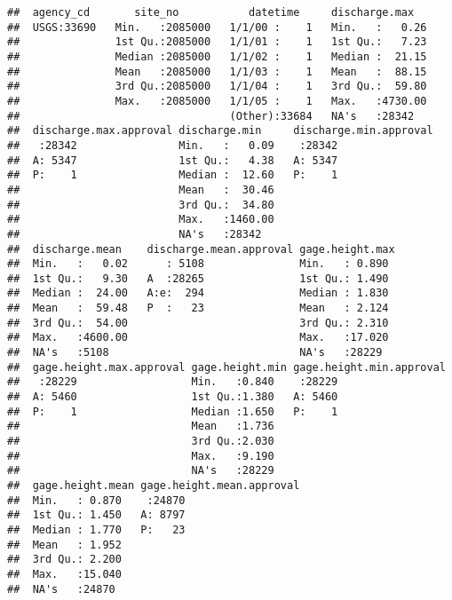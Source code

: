 \documentclass[]{article}
\begin{document}
\begin{verbatim}
##  agency_cd       site_no           datetime     discharge.max    
##  USGS:33690   Min.   :2085000   1/1/00 :    1   Min.   :   0.26  
##               1st Qu.:2085000   1/1/01 :    1   1st Qu.:   7.23  
##               Median :2085000   1/1/02 :    1   Median :  21.15  
##               Mean   :2085000   1/1/03 :    1   Mean   :  88.15  
##               3rd Qu.:2085000   1/1/04 :    1   3rd Qu.:  59.80  
##               Max.   :2085000   1/1/05 :    1   Max.   :4730.00  
##                                 (Other):33684   NA's   :28342    
##  discharge.max.approval discharge.min     discharge.min.approval
##   :28342                Min.   :   0.09    :28342               
##  A: 5347                1st Qu.:   4.38   A: 5347               
##  P:    1                Median :  12.60   P:    1               
##                         Mean   :  30.46                         
##                         3rd Qu.:  34.80                         
##                         Max.   :1460.00                         
##                         NA's   :28342                           
##  discharge.mean    discharge.mean.approval gage.height.max 
##  Min.   :   0.02      : 5108               Min.   : 0.890  
##  1st Qu.:   9.30   A  :28265               1st Qu.: 1.490  
##  Median :  24.00   A:e:  294               Median : 1.830  
##  Mean   :  59.48   P  :   23               Mean   : 2.124  
##  3rd Qu.:  54.00                           3rd Qu.: 2.310  
##  Max.   :4600.00                           Max.   :17.020  
##  NA's   :5108                              NA's   :28229   
##  gage.height.max.approval gage.height.min gage.height.min.approval
##   :28229                  Min.   :0.840    :28229                 
##  A: 5460                  1st Qu.:1.380   A: 5460                 
##  P:    1                  Median :1.650   P:    1                 
##                           Mean   :1.736                           
##                           3rd Qu.:2.030                           
##                           Max.   :9.190                           
##                           NA's   :28229                           
##  gage.height.mean gage.height.mean.approval
##  Min.   : 0.870    :24870                  
##  1st Qu.: 1.450   A: 8797                  
##  Median : 1.770   P:   23                  
##  Mean   : 1.952                            
##  3rd Qu.: 2.200                            
##  Max.   :15.040                            
##  NA's   :24870
\end{verbatim}
\end{document}
